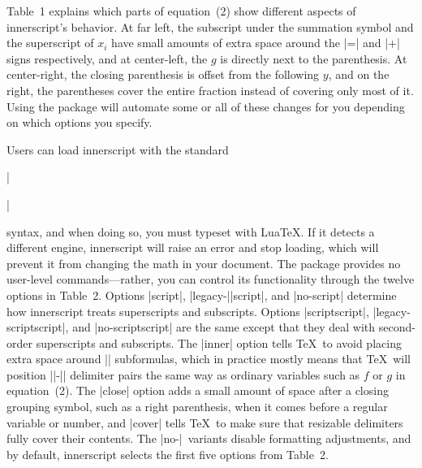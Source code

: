 \documentclass[12pt]{article}
\begin{document}
Table~1 explains which parts of equation~(2) show different aspects of \textsf{innerscript}'s behavior. At far left, the subscript under the summation symbol and the superscript of $x_i$ have small amounts of extra space around the |=| and |+| signs respectively, and at center-left, the $g$ is directly next to the parenthesis. At center-right, the closing parenthesis is offset from the following $y$, and on the right, the parentheses cover the entire fraction instead of covering only most of it. Using the package will automate some or all of these changes for you depending on which options you specify.

Users can load \textsf{innerscript} with the standard
\begin{code}
|\usepackage[||]{innerscript}|
\end{code}
syntax, and when doing so, you must typeset with Lua\TeX. If it detects a different engine, \textsf{innerscript} will raise an error and stop loading, which will prevent it from changing the math in your document. The package provides no user-level commands---rather, you can control its functionality through the twelve options in Table~2. Options |script|, |legacy-||script|, and |no-script| determine how \textsf{innerscript} treats superscripts and subscripts. Options |scriptscript|, |legacy-scriptscript|, and |no-scriptscript| are the same except that they deal with second-order superscripts and subscripts. The |inner| option tells \TeX\ to avoid placing extra space around |\mathinner| subformulas, which in practice mostly means that \TeX\ will position |\left|-|\right| delimiter pairs the same way as ordinary variables such as $f$ or $g$ in equation~(2). The |close| option adds a small amount of space after a closing grouping symbol, such as a right parenthesis, when it comes before a regular variable or number, and |cover| tells \TeX\ to make sure that resizable delimiters fully cover their contents. The |no-|~variants disable formatting adjustments, and by default, \textsf{innerscript} selects the first five options from Table~2.
\end{document}
